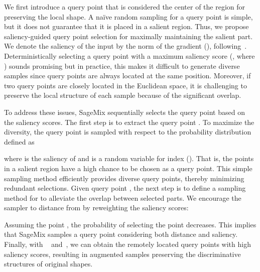 \documentclass{article}
\begin{document}
We first introduce a query point  that is considered the center of the region for preserving the local shape. A na\"ive random sampling for a query point is simple, but it does not guarantee that it is placed in a salient region. Thus, we propose saliency-guided query point selection for maximally maintaining the salient part.
We denote the saliency  of the input  by the norm of the gradient (\ie ), following~\cite{kim2020puzzle,DBLP:conf/iclr/KimCJS21}.
Deterministically selecting a query point with a maximum saliency score (\ie , where ) sounds promising but in practice, this makes it difficult to generate diverse samples since query points are always located at the same position.
Moreover, if two query points  are closely located in the Euclidean space, it is challenging to preserve the local structure of each sample because of the significant overlap.


To address these issues, SageMix sequentially selects the query point based on the saliency scores. The first step is to extract the query point . To maximize the diversity, the query point is sampled with respect to the probability distribution defined as

where  is the saliency of  and  is a random variable for index (). 
That is, the points in a salient region have a high chance to be chosen as a query point.
This simple sampling method efficiently provides diverse query points, thereby minimizing redundant selections.
Given query point , the next step is to define a sampling method for  to alleviate the overlap between selected parts.
We encourage the sampler to distance  from  by reweighting the saliency scores:  

Assuming the point , the probability of selecting the point  decreases.
This implies that SageMix samples a query point considering both distance and saliency.
Finally, with ~ and~, we can obtain the remotely located query points with high saliency scores, resulting in augmented samples preserving the discriminative structures of original shapes.
\end{document}
